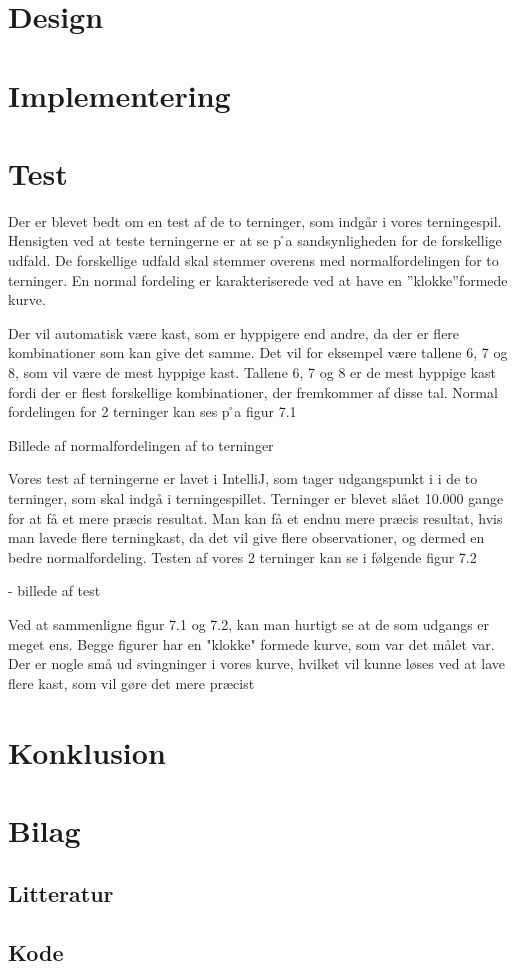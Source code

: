 \documentclass{article}
\begin{document}
\section{Design}



\section{Implementering}

\section{Test}
Der er blevet bedt om en test af de to terninger, som indgår i vores terningespil. Hensigten ved at teste terningerne er at se p ̊a sandsynligheden for de forskellige udfald. De forskellige udfald skal stemmer overens med normalfordelingen for to terninger. En normal fordeling er karakteriserede ved at have en ”klokke”formede kurve. 

Der vil automatisk være kast, som er hyppigere end andre, da der er flere kombinationer som kan give det samme. Det vil for eksempel være tallene  6, 7 og 8, som vil være de mest hyppige kast. Tallene 6, 7 og 8 er de mest hyppige kast fordi der er flest forskellige kombinationer, der fremkommer af disse tal. 
Normal fordelingen for 2 terninger kan ses p ̊a figur 7.1


Billede af normalfordelingen af to terninger


Vores test af terningerne er lavet i IntelliJ, som tager udgangspunkt i i de to terninger, som skal indgå i terningespillet. Terninger er blevet slået 10.000 gange for at få et mere præcis resultat. Man kan få et endnu mere præcis resultat, hvis man lavede flere terningkast, da det vil give flere observationer, og dermed en bedre normalfordeling.
Testen af vores 2 terninger kan se i følgende figur 7.2

- billede af test



Ved at sammenligne figur 7.1 og 7.2, kan man hurtigt se at de som udgangs er meget ens. Begge figurer har en "klokke" formede kurve, som var det målet var. Der er nogle små ud svingninger i vores kurve, hvilket vil kunne løses ved at lave flere kast, som vil gøre det mere præcist 


\section{Konklusion}

\section{Bilag}
\subsection{Litteratur}
\subsection{Kode}
\end{document}
